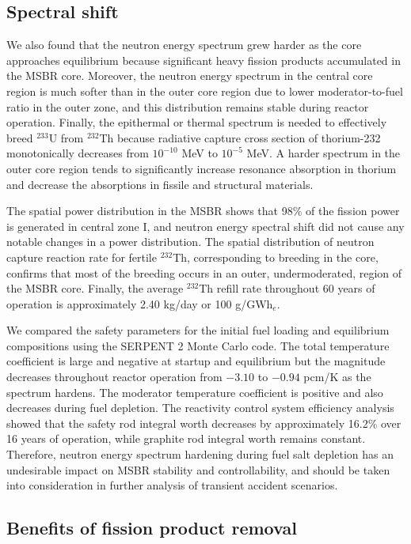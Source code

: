 \subsection{Spectral shift}
We also found that the neutron energy spectrum grew harder as the core  
approaches equilibrium because significant heavy fission products accumulated in 
the \gls{MSBR} core. Moreover, the neutron energy spectrum in the central core 
region is much softer than in the outer core region due to lower 
moderator-to-fuel ratio in the outer zone, and this distribution remains stable 
during reactor operation. Finally, the epithermal or thermal spectrum is needed 
to effectively breed $^{233}$U from $^{232}$Th because radiative capture cross 
section of thorium-232 monotonically decreases from $10^{-10}$ MeV to $10^{-5}$ 
MeV. A harder spectrum in the outer core region tends to significantly increase 
resonance absorption in thorium and decrease the absorptions in fissile and 
structural materials. 

The spatial power distribution in the \gls{MSBR} shows that 98\% of the fission 
power is generated in central zone I, and neutron energy spectral shift did not 
cause any notable changes in a power distribution. The spatial distribution of 
neutron capture reaction rate for fertile $^{232}$Th, corresponding to breeding in 
the core, confirms that most of the breeding occurs in an outer, 
undermoderated, region of the \gls{MSBR} core. Finally, the average $^{232}$Th 
refill rate throughout 60 years of operation is approximately 2.40 kg/day or 
100 g/GWh$_e$.

We compared the safety parameters for the initial fuel loading and 
equilibrium compositions using the SERPENT 2 Monte Carlo code. 
The total temperature coefficient 
is large and negative at startup and equilibrium but the magnitude decreases 
throughout reactor operation from $-3.10$ to $-0.94$ pcm/K as the spectrum 
hardens. The moderator 
temperature coefficient is positive and also decreases during fuel depletion. 
The reactivity control system efficiency analysis showed that the safety rod integral 
worth decreases by approximately 16.2\% over 16 years of operation, while 
graphite rod integral worth remains constant. Therefore, neutron energy 
spectrum hardening during fuel salt depletion has an undesirable impact on 
\gls{MSBR} stability and controllability, and should be taken into 
consideration in further analysis of transient accident scenarios.

\subsection{Benefits of fission product removal}

